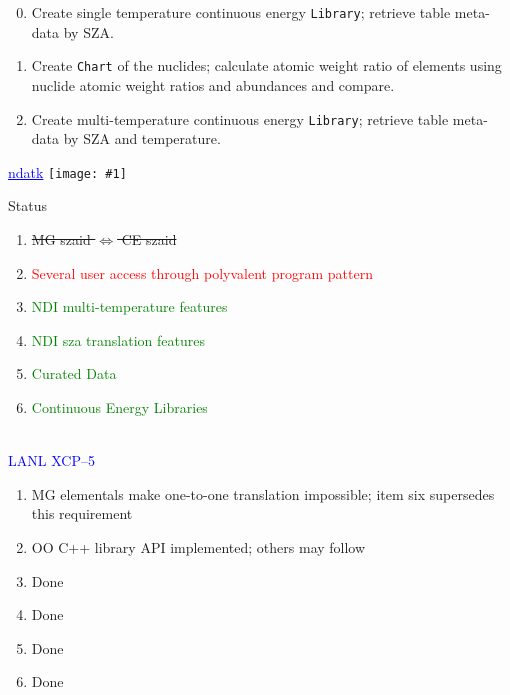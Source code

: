 \documentclass[clock]{slides}
\newenvironment{xslide}[1][logo.jpg]{\begin{slide} \tiny
\textcolor{blue}{\underline{ndatk}} \hfill
\texttt{[image: \#1]}
\normalsize}{\vfill\tiny
\textcolor{blue}{\hrulefill \\LANL XCP--5}
\end{slide}}
\begin{document}
\begin{note}\small
\begin{enumerate}
\setcounter{enumi}{-1}
\item Create single temperature continuous energy \texttt{Library}; retrieve
  table meta-data by SZA.
\item Create \texttt{Chart} of the nuclides; calculate atomic weight
  ratio of elements using nuclide atomic weight ratios and abundances
  and compare.
\item Create multi-temperature continuous energy \texttt{Library};
  retrieve table meta-data by SZA and temperature.
\end{enumerate}

\end{note}

\begin{xslide}
\begin{center}\Large
Status
\end{center}
\begin{enumerate}
\item \sout{MG szaid $\Leftrightarrow$ CE szaid}
\item \textcolor{red}{Several user access through polyvalent program pattern}
\item \textcolor{green}{NDI multi-temperature features}
\item \textcolor{green}{NDI sza translation features}
\item \textcolor{green}{Curated Data}
\item \textcolor{green}{Continuous Energy Libraries}
\end{enumerate}

\end{xslide}

\begin{note}\small
\begin{enumerate}
\item MG elementals make one-to-one translation impossible; item six
  supersedes this requirement
\item OO C++ library API implemented; others may follow
\item Done
\item Done
\item Done
\item Done
\end{enumerate}
\end{note}
\end{document}
